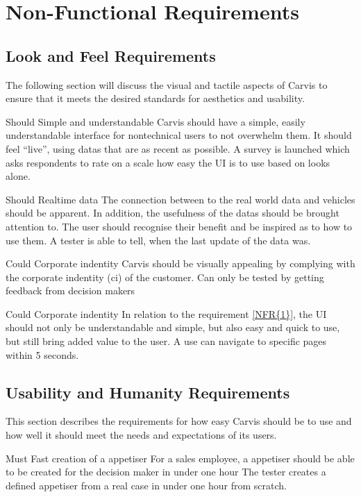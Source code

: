 \chapter{Non-Functional Requirements}

\section{Look and Feel Requirements}
The following section will discuss the visual and tactile aspects of Carvis to ensure that it meets the desired standards for aesthetics and usability.
\label{sec:appearancerequirements}

{Should}
{Simple and understandable}
{Carvis should have a simple, easily understandable interface for \gls{nontechnical} users to not overwhelm them. It should feel \enquote{live}, using \glspl{data} that are as recent as possible.}
{A survey is launched which asks respondents to rate on a scale how easy the UI is to use based on looks alone.}

{Should}
{Realtime data}
{The connection between to the real world data and vehicles should be apparent. In addition, the usefulness of the \glspl{data} should be brought attention to. The user should recognise their benefit and be inspired as to how to use them.}
{A tester is able to tell, when the last update of the data was.}

{Could}
{Corporate indentity}
{Carvis should be visually appealing by complying with the corporate indentity (\gls{ci}) of the customer.}
{Can only be tested by getting feedback from decision makers}

{Could}
{Corporate indentity}
{In relation to the requirement \autoref{NFR{1}}, the UI should not only be understandable and simple, but also easy and quick to use, but still bring added value to the user.}
{A use can navigate to specific pages within 5 seconds.}

\section{Usability and Humanity Requirements}
This section describes the requirements for how easy Carvis should be to use and how well it should meet the needs and expectations of its users.

{Must}
{Fast creation of a \gls{appetiser}}
{For a sales employee, a \gls{appetiser} should be able to be created for the decision maker in under one hour}
{The tester creates a defined \gls{appetiser} from a real case in under one hour from scratch.}

